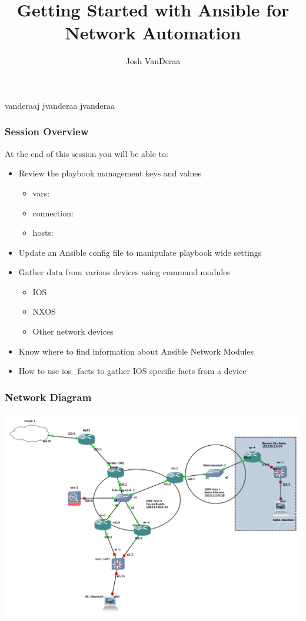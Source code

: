 \documentclass{beamer}
\title{Getting Started with Ansible for Network Automation}
\date{}
\author{Josh VanDeraa}
\begin{document}
\begin{frame}
  \maketitle
  \footnotesize
  \faTwitter vanderaaj \hfill \faGithub jvanderaa \hfill \faSlack jvanderaa
\end{frame}

\begin{frame}
  \frametitle{Session Overview}
  At the end of this session you will be able to:
  \begin{itemize}
    \item <2-> Review the playbook management keys and values
      \begin{itemize}
        \item <3-> vars:
        \item <4-> connection:
        \item <5-> hosts:
      \end{itemize}
    \item <6-> Update an Ansible config file to manipulate playbook wide settings
    \item <7-> Gather data from various devices using command modules
      \begin{itemize}
        \item IOS
        \item NXOS
        \item Other network devices
      \end{itemize}
    \item <8-> Know where to find information about Ansible Network Modules
    \item <9-> How to use ios_facts to gather IOS specific facts from a device
  \end{itemize}
\end{frame}

\begin{frame}
\frametitle{Network Diagram}
\includegraphics[width=\textwidth]{assets/base_setup.png}
\end{frame}
\end{document}
